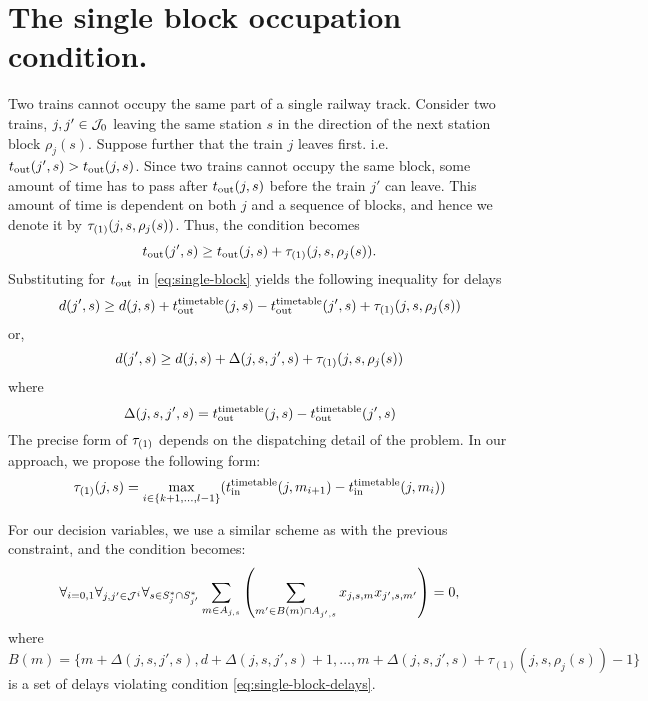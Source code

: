 \section{The single block occupation condition.}
Two trains cannot occupy the same part of a single railway track. Consider two
trains, $j, j' \in \mathcal{J}_0$ leaving the same station $s$ in the direction of the
next station block $\rho_j(s)$. Suppose further that the train $j$ leaves
first. i.e. $t_\text{out}(j', s) > t_\text{out}(j, s)$. Since two trains cannot occupy the
same block, some amount of time has to pass after $t_\text{out}(j, s)$ before the
train $j'$ can leave. This amount of time is dependent on both $j$ and a
sequence of blocks, and hence we denote it by $\tau_{(1)}(j, s, \rho_j(s))$. Thus,
the condition becomes
\begin{equation}
  \label{eq:single-block}
  t_\text{out}(j', s) \ge t_\text{out}(j, s) + \tau_{(1)}(j, s, \rho_j(s)).
\end{equation}
Substituting for $t_\text{out}$ in \eqref{eq:single-block} yields the following
inequality for delays
\begin{equation}
  \label{eq:single-block-delays}
  d(j', s) \ge d(j, s) + t_\text{out}^\text{timetable}(j, s) - t_\text{out}^\text{timetable}(j', s) + \tau_{(1)}(j, s, \rho_j(s))
\end{equation}
or,
\begin{equation}
  d(j', s) \ge d(j, s) + \Delta(j, s, j', s) + \tau_{(1)}(j, s, \rho_j(s))
\end{equation}
where
\begin{equation}
  \label{eq:delta}
  \Delta(j, s, j', s) = t_\text{out}^\text{timetable}(j, s) - t_\text{out}^\text{timetable}(j', s)
\end{equation}
The precise form of $\tau_{(1)}$ depends on the dispatching detail of the problem.
In our approach, we propose the following form:
\begin{equation}
  \tau_{(1)}(j, s) = \max_{i \in \{k+1,\ldots,l-1\}}(t_\text{in}^\text{timetable}(j, m_{i+1}) - t_\text{in}^\text{timetable}(j, m_i))
\end{equation}

For our decision variables, we use a similar scheme as with the previous
constraint, and the condition becomes:
\begin{equation}
  \label{eq:qubo:singleblock}
  \forall_{i=0,1} \forall_{j, j' \in \mathcal{J}^{i}} \forall_{s \in S^{*}_{j} \cap S^{*}_{j'}} \sum_{m \in A_{j, s}} \left(
  \sum_{m' \in B(m) \cap A_{j', s}} x_{j,s,m}x_{j',s,m'}
  \right) = 0,
\end{equation}
where $B(m) = \{m + \Delta(j, s, j', s), d + \Delta(j, s, j', s)+ 1,\ldots, m +
    \Delta(j, s, j', s) + \tau_{(1)}(j,s, \rho_j(s))-1 \}$ is a set of delays
violating condition \eqref{eq:single-block-delays}.


